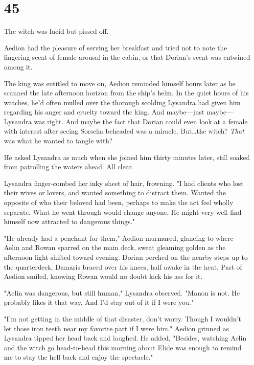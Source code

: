
\chapter{45}

The witch was lucid but pissed off.

Aedion had the pleasure of serving her breakfast and tried not to note the lingering scent of female arousal in the cabin, or that Dorian's scent was entwined among it.

The king was entitled to move on, Aedion reminded himself hours later as he scanned the late afternoon horizon from the ship's helm.
In the quiet hours of his watches, he'd often mulled over the thorough scolding Lysandra had given him regarding his anger and cruelty toward the king.
And maybe---just maybe--- Lysandra was right.
And maybe the fact that Dorian could even look at a female with interest after seeing Sorscha beheaded was a miracle.
But\ldots the witch?
\emph{That} was what he wanted to tangle with?

He asked Lysandra as much when she joined him thirty minutes later, still soaked from patrolling the waters ahead.
All clear.

Lysandra finger-combed her inky sheet of hair, frowning.
"I had clients who lost their wives or lovers, and wanted something to distract them.
Wanted the opposite of who their beloved had been, perhaps to make the act feel wholly separate.
What he went through would change anyone.
He might very well find himself now attracted to dangerous things."

"He already had a penchant for them," Aedion murmured, glancing to where Aelin and Rowan sparred on the main deck, sweat gleaming golden as the afternoon light shifted toward evening.
Dorian perched on the nearby steps up to the quarterdeck, Damaris braced over his knees, half awake in the heat.
Part of Aedion smiled, knowing Rowan would no doubt kick his ass for it.

"Aelin was dangerous, but still human," Lysandra observed.
"Manon is  not.
He probably likes it that way.
And I'd stay out of it if I were you."

"I'm not getting in the middle of that disaster, don't worry.
Though I wouldn't let those iron teeth near my favorite part if I were him."
Aedion grinned as Lysandra tipped her head back and laughed.
He added, "Besides, watching Aelin and the witch go head-to-head this morning about Elide was enough to remind me to stay the hell back and enjoy the spectacle."

